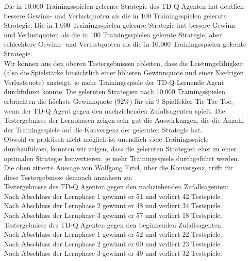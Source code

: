 Die in 10.000 Trainingsspielen gelernte Strategie des TD-Q Agenten hat deutlich bessere Gewinn- und Verlustquoten  als die in 100 Trainingsspielen gelernte Strategie. Die in 1.000 Trainingsspielen gelernte Strategie hat bessere Gewinn- und Verlustquoten als die in 100 Trainingsspielen gelernte Strategie, aber schlechtere Gewinn- und Verlustquoten als die in 10.000 Trainingsspielen gelernte Strategie.\\

Wir können aus den oberen Testergebnissen ableiten, dass die Leistungsfähigkeit (also die Spielstärke hinsichtlich einer höheren Gewinnquote und einer Niedrigen Verlustquote) ansteigt, je mehr Trainingsspiele der TD-Q-Lernende Agent durchführen konnte. Die gelernten Strategien nach 10.000 Trainingsspielen erbrachten die höchste Gewinnquote (92\%) für ein 9 Spielfelder Tic Tac Toe, wenn der TD-Q Agent gegen den nachziehenden Zufallsagenten spielt. Die Testergebnisse der Lernphasen zeigen sehr gut die Auswirkungen, die die Anzahl der Trainingsspiele auf die Konvergenz der gelernten Strategie hat. \\

Obwohl es praktisch nicht möglich ist unendlich viele Trainingsspiele durchzuführen, konnten wir zeigen, dass die gelernten Strategien eher zu einer optimalen Strategie konvertieren, je mehr Trainingsspiele durchgeführt werden. Die oben zitierte Aussage von Wolfgang Ertel, über die Konvergenz, trifft für diese Testergebnisse demnach annähern zu. \\

Testergebnisse des TD-Q Agenten gegen den nachziehenden Zufallsagenten: \\
Nach Abschluss der Lernphase 1 gewinnt er 51 und verliert 42 Testspiele. \\
Nach Abschluss der Lernphase 2 gewinnt er 48 und verliert 34 Testspiele. \\
Nach Abschluss der Lernphase 3 gewinnt er 57 und verliert 18 Testspiele. \\

Testergebnisse des TD-Q Agenten gegen den beginnenden Zufallsagenten: \\
Nach Abschluss der Lernphase 1 gewinnt er 52 und verliert 22 Testspiele. \\
Nach Abschluss der Lernphase 2 gewinnt er 60 und verliert 23 Testspiele. \\ Nach Abschluss der Lernphase 3 gewinnt er 49 und verliert 32 Testspiele. \\

